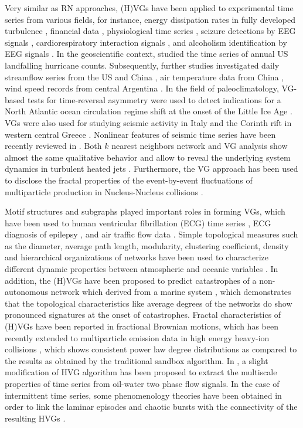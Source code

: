 	Very similar as RN approaches, (H)VGs have been applied to experimental time series from various fields, for instance, energy dissipation rates in fully developed turbulence \cite{Liu2010,Manshour2015,Manshour2015a}, financial data \cite{Ni2009,Yang2009,Qian2010,Wang2012,Flanagan2016}, physiological time series \cite{Lacasa2009,Shao2010,Dong2010,Ahmadlou2010,Jiang2013,Hou2014}, seizure detections by EEG signals \cite{Bhaduri2015,Liu2017a,Zhang2018}, cardiorespiratory interaction signals \cite{Long2014}, and alcoholism identification by EEG signals \cite{Zhu2014}. In the geoscientific context, \cite{Elsner2009} studied the time series of annual US landfalling hurricane counts. Subsequently, further studies investigated daily streamflow series from the US and China \cite{Tang2010}, air temperature data from China \cite{Wang2009}, wind speed records from central Argentina \cite{Pierini2012}. In the field of paleoclimatology, VG-based tests for time-reversal asymmetry were used to detect indications for a North Atlantic ocean circulation regime shift at the onset of the Little Ice Age \cite{schleussner2015indications}. VGs were also used for studying seismic activity in Italy \cite{Telesca2012}  and the  Corinth rift in western central Greece \cite{Hloupis2017}. Nonlinear features of seismic time series have been recently reviewed in \cite{Telesca2018b}. Both $k$ nearest neighbors network and VG analysis show almost the same qualitative behavior and allow to reveal the underlying system dynamics in turbulent heated jets \cite{Charakopoulos2014}. Furthermore, the VG approach has been used to disclose the fractal properties of the event-by-event fluctuations of multiparticle production in Nucleus-Nucleus collisions \cite{Mondal2018}.

	 Motif structures and subgraphs played important roles in forming VGs, which have been used to human ventricular fibrillation (ECG) time series \cite{Li2011,Li2012}, ECG diagnosis of epilepsy \cite{Tang2013}, and air traffic flow data \cite{Liu2018}. Simple topological measures such as the diameter, average path length, modularity, clustering coefficient, density and hierarchical organizations of networks have been used to characterize different dynamic properties between atmospheric and oceanic variables \cite{CHARAKOPOULOS2018}. In addition, the (H)VGs have been proposed to predict catastrophes of a non-autonomous network which derived from a marine system \cite{Zhang2018b}, which demonstrates that the topological characteristics like average degrees of the networks do show pronounced signatures at the onset of catastrophes. Fractal characteristics of (H)VGs have been reported in fractional Brownian motions, which has been recently extended to multiparticle emission data in high energy heavy-ion collisions \cite{Mali2018}, which shows consistent power law degree distributions as compared to the results as obtained by the traditional sandbox algorithm. In \cite{Gao2016}, a slight modification of HVG algorithm has been proposed to extract the multiscale properties of time series from oil-water two phase flow signals. In the case of intermittent time series, some phenomenology theories have been obtained in order to link the laminar episodes and chaotic bursts with the connectivity of the resulting HVGs \cite{Nunez2013,Nunez2014}.

